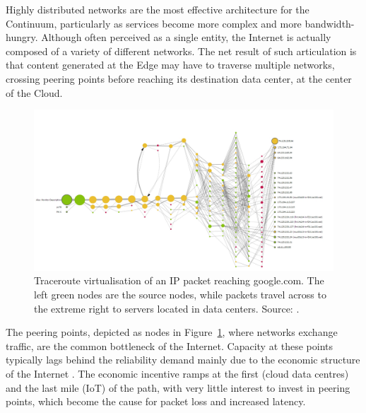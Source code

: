 
Highly distributed networks are the most effective architecture for the Continuum, particularly as services become more complex and more bandwidth-hungry. Although often perceived as a single entity, the Internet is actually composed of a variety of different networks. 
The net result of such articulation is that content generated at the Edge may have to traverse multiple networks, crossing peering points before reaching its destination data center, at the center of the Cloud.

\begin{figure}[ht]
\centering
\includegraphics[width=\columnwidth]{figures/traceroute}
\caption{Traceroute virtualisation of an IP packet reaching google.com. The left green nodes are the source nodes, while packets travel across to the extreme right to servers located in data centers. Source: \cite{traceroute-google}.}
\label{fig:traceroute}
\end{figure}

The peering points, depicted as nodes in Figure~\ref{fig:traceroute}, where networks exchange traffic, are the common bottleneck of the Internet. Capacity at these points typically lags behind the reliability demand mainly due to the economic structure of the Internet \cite{nygren2010akamai}. The economic incentive ramps at the first (cloud data centres) and the last mile (IoT) of the path, with very little interest to invest in peering points, which become the cause for packet loss and increased latency.

